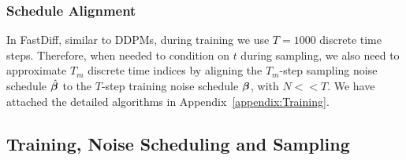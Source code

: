 \subsubsection{Schedule Alignment} \label{schedule}

In FastDiff, similar to DDPMs, during training we use $T=1000$ discrete time steps. Therefore, when needed to condition on $t$ during sampling, we also need to approximate $T_m$ discrete time indices by aligning the $T_m$-step sampling noise schedule $\hat{{\bm{\beta}}}$ to the $T$-step training noise schedule ${\bm{\beta}}$, with $N<<T$. We have attached the detailed algorithms in Appendix~\ref{appendix:Training}. 




\subsection{Training, Noise Scheduling and Sampling}

